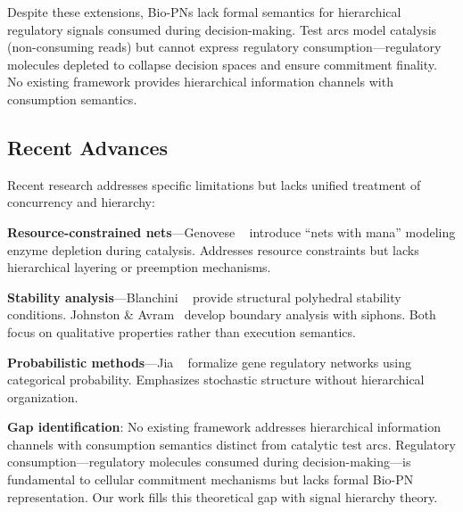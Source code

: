 Despite these extensions, Bio-PNs lack formal semantics for hierarchical regulatory signals consumed during decision-making. Test arcs model catalysis (non-consuming reads) but cannot express regulatory consumption---regulatory molecules depleted to collapse decision spaces and ensure commitment finality. No existing framework provides hierarchical information channels with consumption semantics.

\subsection{Recent Advances}

Recent research addresses specific limitations but lacks unified treatment of concurrency and hierarchy:

\noindent\textbf{Resource-constrained nets}---Genovese \etal~\cite{genovese2021} introduce ``nets with mana'' modeling enzyme depletion during catalysis. Addresses resource constraints but lacks hierarchical layering or preemption mechanisms.

\noindent\textbf{Stability analysis}---Blanchini \etal~\cite{blanchini2021} provide structural polyhedral stability conditions. Johnston \& Avram~\cite{johnston2025} develop boundary analysis with siphons. Both focus on qualitative properties rather than execution semantics.

\noindent\textbf{Probabilistic methods}---Jia \etal~\cite{jia2025} formalize gene regulatory networks using categorical probability. Emphasizes stochastic structure without hierarchical organization.

\noindent\textbf{Gap identification}: No existing framework addresses hierarchical information channels with consumption semantics distinct from catalytic test arcs. Regulatory consumption---regulatory molecules consumed during decision-making---is fundamental to cellular commitment mechanisms but lacks formal Bio-PN representation. Our work fills this theoretical gap with signal hierarchy theory.